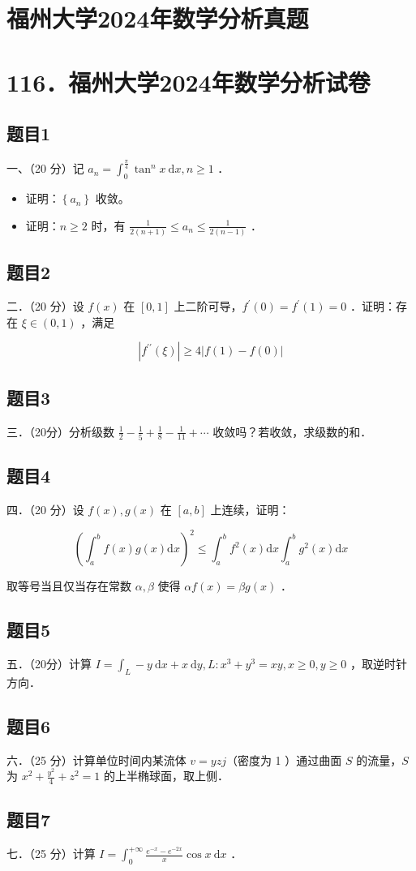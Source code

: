 \documentclass{article}
\begin{document}
\section*{福州大学2024年数学分析真题}
\section*{116．福州大学2024年数学分析试卷}

\subsection{题目1}
一、（20 分）记 \(a_{n}=\int_{0}^{\frac{\pi}{4}} \tan ^{n} x \mathrm{~d} x, n \geq 1\) ．

\begin{itemize}
  \item[（1）] 证明：\(\left\{a_{n}\right\}\) 收敛。
  \item[（2）] 证明：\(n \geq 2\) 时，有 \(\frac{1}{2(n+1)} \leq a_{n} \leq \frac{1}{2(n-1)}\) ．
\end{itemize}

\subsection{题目2}
二．（20 分）设 \(f(x)\) 在 \([0,1]\) 上二阶可导，\(f^{\prime}(0)=f^{\prime}(1)=0\) ．证明：存在 \(\xi \in(0,1)\) ，满足

\[
\left|f^{\prime \prime}(\xi)\right| \geq 4|f(1)-f(0)|
\]

\subsection{题目3}
三．（20分）分析级数 \(\frac{1}{2}-\frac{1}{5}+\frac{1}{8}-\frac{1}{11}+\cdots\) 收敛吗？若收敛，求级数的和．

\subsection{题目4}
四．（20 分）设 \(f(x), g(x)\) 在 \([a, b]\) 上连续，证明：

\[
\left(\int_{a}^{b} f(x) g(x) \mathrm{d} x\right)^{2} \leq \int_{a}^{b} f^{2}(x) \mathrm{d} x \int_{a}^{b} g^{2}(x) \mathrm{d} x
\]

取等号当且仅当存在常数 \(\alpha, \beta\) 使得 \(\alpha f(x)=\beta g(x)\) ．

\subsection{题目5}
五．（20分）计算 \(I=\int_{L}-y \mathrm{~d} x+x \mathrm{~d} y, L: x^{3}+y^{3}=x y, x \geq 0, y \geq 0\) ，取逆时针方向．

\subsection{题目6}
六．（25 分）计算单位时间内某流体 \(v=y z j\)（密度为 1 ）通过曲面 \(S\) 的流量，\(S\) 为 \(x^{2}+\frac{y^{2}}{4}+z^{2}=1\) 的上半椭球面，取上侧．

\subsection{题目7}
七．（25 分）计算 \(I=\int_{0}^{+\infty} \frac{e^{-x}-e^{-2 x}}{x} \cos x \mathrm{~d} x\) ．
\end{document}
